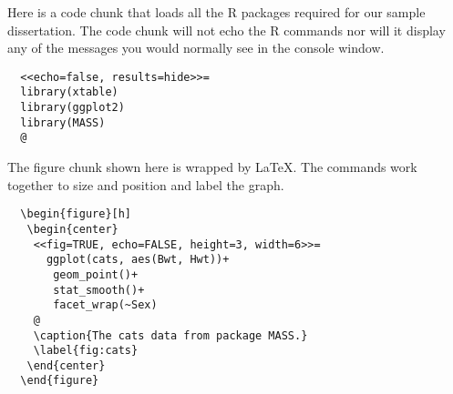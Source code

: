 \begin{singlespace}
Here is a code chunk that loads all the R packages required for our sample dissertation. The code chunk will not echo the R commands nor will it display any of the messages you would normally see in the console window.

\begin{verbatim}
  <<echo=false, results=hide>>=
  library(xtable)
  library(ggplot2)
  library(MASS)
  @
\end{verbatim}

The figure chunk shown here is wrapped by \LaTeX{}.  The commands work together to size and position and label the graph.

\begin{verbatim}
  \begin{figure}[h]
   \begin{center}
    <<fig=TRUE, echo=FALSE, height=3, width=6>>=
      ggplot(cats, aes(Bwt, Hwt))+
       geom_point()+
       stat_smooth()+
       facet_wrap(~Sex)       
    @
    \caption{The cats data from package MASS.}
    \label{fig:cats}
   \end{center}  
  \end{figure}
\end{verbatim}
\end{singlespace}
